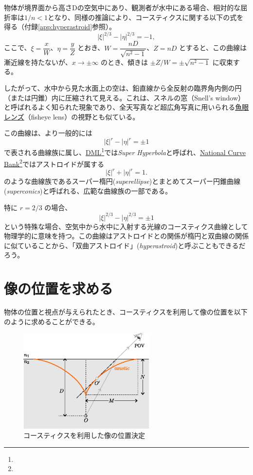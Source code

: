 \documentclass[twocolumn]{article}
\begin{document}
物体が境界面から高さDの空気中にあり、観測者が水中にある場合、相対的な屈折率は$1/n < 1$となり、同様の推論により、コースティクスに関する以下の式を得る（付録\ref{app:hyperastroid}参照）。
$$ \left| \xi \right|^{2/3} - \left| \eta \right|^{2/3} = -1, $$
ここで、$\xi = \dfrac{x}{W} $、$\eta = \dfrac{y}{Z}$ とおき、$W = \dfrac{nD}{\sqrt{n^2-1}}$、$Z = nD$ とすると、この曲線は漸近線を持たないが、$x \to \pm \infty$ のとき、傾きは $\pm Z/W = \pm \sqrt{n^2-1}$ に収束する。

したがって、水中から見た水面上の空は、鉛直線から全反射の臨界角内側の円（または円錐）内に圧縮されて見える。これは、スネルの窓（Snell's window）と呼ばれるよく知られた現象であり、全天写真など超広角写真に用いられる\href{https://ja.wikipedia.org/wiki/%E9%AD%9A%E7%9C%BC%E3%83%AC%E3%83%B3%E3%82%BA}{魚眼レンズ}（fisheye lens）の視野とも似ている。

この曲線は、より一般的には
$$ \left| \xi \right|^{r} - \left| \eta \right|^{r} = \pm1 $$
で表される曲線族に属し、\href{http://dynamicmathematicslearning.com/super-ellipse.html}{DML}\footnote{}では\emph{Super Hyperbola}と呼ばれ、\href{https://old.nationalcurvebank.org/superconicncb/superconicncb.htm}{National Curve Bank}\footnote{}ではアストロイドが属する
$$ \left| \xi \right|^{r} + \left| \eta \right|^{r} = 1. $$
のような曲線族であるスーパー楕円(\emph{superellipse})とまとめてスーパー円錐曲線(\emph{superconics})と呼ばれる、広範な曲線族の一部である。

特に $r = 2/3$ の場合、
$$ \left| \xi \right|^{2/3} - \left| \eta \right|^{2/3} = \pm1 $$
という特殊な場合、空気中から水中に入射する光線のコースティクス曲線として物理学的に意味を持つ。この曲線はアストロイドとの関係が楕円と双曲線の関係に似ていることから、「双曲アストロイド」(\emph{hyperastroid})と呼ぶこともできるだろう。
	
\section{像の位置を求める}

物体の位置と視点が与えられたとき、コースティクスを利用して像の位置を以下のように求めることができる。

\begin{figure}[!h]
	\centering
	\includegraphics[width=2.7in]{figs/g394.eps}
	\caption{コースティクスを利用した像の位置決定}
	\label{fig:image_caustic}
\end{figure}
\end{document}
